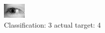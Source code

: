 \begin{figure}[h!]
\begin{center}
\includegraphics[width=0.60\columnwidth]{figures/ID3209_class_3_target_4.png}
\end{center}
\caption{ Classification: 3 actual target: 4}
\label{fig:ID3209_class_3_target_4}
\end{figure}
